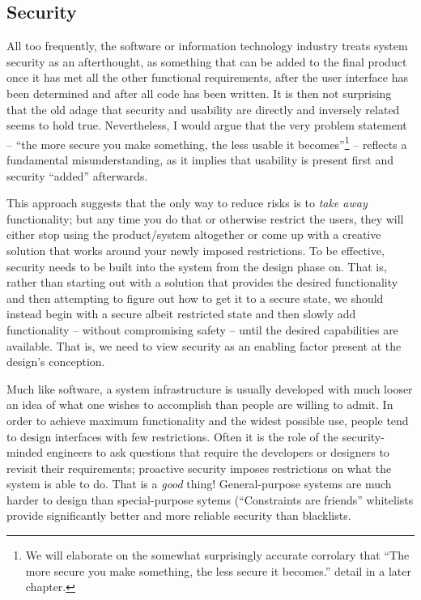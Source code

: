 \subsection{Security}
\label{introduction:pillars:security}

All too frequently, the software or information
technology industry treats system security as an
afterthought, as something that can be added to the
final product once it has met all the other functional
requirements, after the user interface has been
determined and after all code has been written.  It is
then not surprising that the old adage that security
and usability are directly and inversely related seems
to hold true.  Nevertheless, I would argue that the
very problem statement -- ``the more secure you make
something, the less usable it becomes''\footnote{We
will elaborate on the somewhat surprisingly accurate
corrolary that ``The more secure you make something,
the less secure it
becomes.''\cite{intro:norman-security} detail in a
later chapter.} -- reflects a fundamental
misunderstanding, as it implies that usability is
present first and security ``added'' afterwards.

This approach suggests that the only way to reduce
risks is to {\em take away} functionality; but any
time you do that or otherwise restrict the users, they
will either stop using the product/system altogether
or come up with a creative solution that works around
your newly imposed restrictions.  To be effective,
security needs to be built into the system from the
design phase on.  That is, rather than starting out
with a solution that provides the desired
functionality and then attempting to figure out how to
get it to a secure state, we should instead begin with
a secure albeit restricted state and then slowly add
functionality -- without compromising safety -- until
the desired capabilities are available.  That is, we
need to view security as an enabling factor present at
the design's conception.

Much like software, a system infrastructure is usually
developed with much looser an idea of what one wishes
to accomplish than people are willing to admit.  In
order to achieve maximum functionality and the widest
possible use, people tend to design interfaces with
few restrictions.  Often it is the role of the
security-minded engineers to ask questions that
require the developers or designers to revisit their
requirements; proactive security imposes restrictions
on what the system is able to do.  That is a {\em
good} thing!  General-purpose systems are much harder
to design than special-purpose sytems (``Constraints
are friends''\cite{intro:brooks-design} whitelists
provide significantly better and more reliable
security than blacklists.

